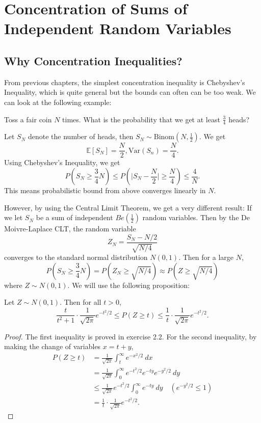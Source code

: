 \section{Concentration of Sums of Independent Random Variables}

\subsection{Why Concentration Inequalities?}
From previous chapters, the simplest concentration inequality is Chebyshev's Inequality, which is quite 
general but the bounds can often can be too weak. We can look at the following example:

\begin{example}
\label{ex:2.1.1}
Toss a fair coin $N$ times. What is the probability that we get at least $\frac{3}{4}$ heads?

Let $S_N$ denote the number of heads, then $S_N \sim \text{Binom}(N, \frac{1}{2})$. We get 
\[ \mathbb{E}[S_N] = \frac{N}{2}, \mathrm{Var}(S_n) = \frac{N}{4}. \]
Using Chebyshev's Inequality, we get 
\[ P(S_N \geq \frac{3}{4}N) \leq P(\bigg| S_N - \frac{N}{2} \bigg| \geq \frac{N}{4}) \leq \frac{4}{N}. \]
This means probabilistic bound from above converges linearly in $N$. 

However, by using the Central Limit Theorem, we get a very different result: If we let $S_N$ be a sum of 
independent $Be(\frac{1}{2})$ random variables. Then by the De Moivre-Laplace CLT, the random variable 
\[ Z_N = \frac{S_N - N/2}{\sqrt{N/4}} \]
converges to the standard normal distribution $N(0, 1)$. Then for a large $N$, 
\[ P(S_N \geq \frac{3}{4}N) = P(Z_N \geq \sqrt{N/4}) \approx P(Z \geq \sqrt{N/4}) \]
where $Z \sim N(0, 1)$. We will use the following proposition: 

\begin{proposition}
\label{prop:2.1.2}
Let $Z \sim N(0, 1)$. Then for all $t > 0$, 
\[  \frac{t}{t^2 + 1} \cdot \frac{1}{\sqrt{2 \pi}}e^{-t^2 / 2} \leq P(Z \geq t) 
\leq \frac{1}{t} \cdot \frac{1}{\sqrt{2 \pi}}e^{-t^2 / 2}. \]
\end{proposition}

\begin{proof}
The first inequality is proved in exercise 2.2. For the second inequality, by making the change 
of variables $x = t + y$,
\begin{align*}
	P(Z \geq t) 
	&= \frac{1}{\sqrt{2 \pi}} \int_{t}^{\infty} e^{-x^2 / 2} \ dx \\
	&= \frac{1}{\sqrt{2 \pi}} \int_{0}^{\infty} e^{-t^2 / 2} e^{-ty} e^{-y^2 / 2} \ dy \\
	&\leq \frac{1}{\sqrt{2 \pi}} e^{-t^2 / 2} \int_{0}^{\infty} e^{-ty} \ dy 
	\quad (e^{-y^2 / 2} \leq 1) \\
	&= \frac{1}{t} \cdot \frac{1}{\sqrt{2 \pi}}e^{-t^2 / 2}.
\end{align*}
\end{proof}


\end{example}
